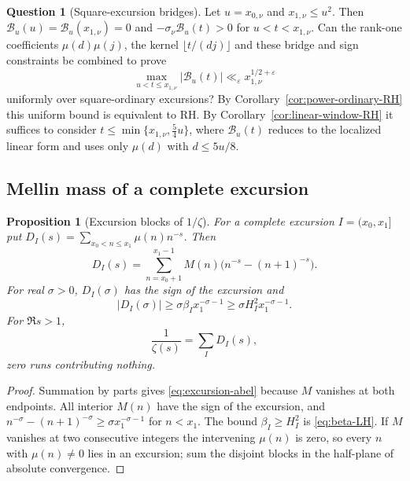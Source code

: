 \documentclass[11pt]{amsart}
\numberwithin{equation}{section}
\theoremstyle{plain}
\newtheorem{proposition}[theorem]{Proposition}
\theoremstyle{definition}
\newtheorem{question}[theorem]{Question}
\theoremstyle{remark}
\newcommand{\eps}{\varepsilon}
\begin{document}
\begin{question}[Square-excursion bridges]
\label{q:excursion-constraint}
Let $u=x_{0,\nu}$ and $x_{1,\nu}\le u^2$. Then
$\mathcal B_u(u)=\mathcal B_u(x_{1,\nu})=0$ and
$-\sigma_\nu\mathcal B_u(t)>0$ for $u<t<x_{1,\nu}$. Can the rank-one
coefficients $\mu(d)\mu(j)$, the kernel $\lfloor t/(dj)\rfloor$ and these
bridge and sign constraints be combined to prove
\[
\max_{u<t\le x_{1,\nu}}|\mathcal B_u(t)|
\ll_\eps x_{1,\nu}^{1/2+\eps}
\]
uniformly over square-ordinary excursions? By
Corollary~\ref{cor:power-ordinary-RH} this uniform bound is equivalent to
RH. By Corollary~\ref{cor:linear-window-RH} it suffices to consider
$t\le\min\{x_{1,\nu},\frac54u\}$, where $\mathcal B_u(t)$ reduces to
the localized linear form and uses only $\mu(d)$ with $d\le5u/8$.
\end{question}

\subsection{Mellin mass of a complete excursion}

\begin{proposition}[Excursion blocks of $1/\zeta$]
\label{prop:excursion-mellin}
For a complete excursion $I=(x_0,x_1]$ put
$D_I(s)=\sum_{x_0<n\le x_1}\mu(n)n^{-s}$. Then
\begin{equation}
\label{eq:excursion-abel}
D_I(s)=\sum_{n=x_0+1}^{x_1-1}M(n)
\bigl(n^{-s}-(n+1)^{-s}\bigr).
\end{equation}
For real $\sigma>0$, $D_I(\sigma)$ has the sign of the excursion and
\begin{equation}
\label{eq:excursion-mass-lower}
|D_I(\sigma)|\ge
\sigma\beta_I x_1^{-\sigma-1}
\ge\sigma H_I^2x_1^{-\sigma-1}.
\end{equation}
For $\Re s>1$,
\begin{equation}
\label{eq:1overzeta-excursions}
\frac1{\zeta(s)}=\sum_I D_I(s),
\end{equation}
zero runs contributing nothing.
\end{proposition}

\begin{proof}
Summation by parts gives \eqref{eq:excursion-abel} because $M$ vanishes at
both endpoints. All interior $M(n)$ have the sign of the excursion, and
$n^{-\sigma}-(n+1)^{-\sigma}\ge\sigma x_1^{-\sigma-1}$ for $n<x_1$. The
bound $\beta_I\ge H_I^2$ is \eqref{eq:beta-LH}. If $M$ vanishes at two
consecutive integers the intervening $\mu(n)$ is zero, so every $n$ with
$\mu(n)\ne0$ lies in an excursion; sum the disjoint blocks in the
half-plane of absolute convergence.
\end{proof}
\end{document}
